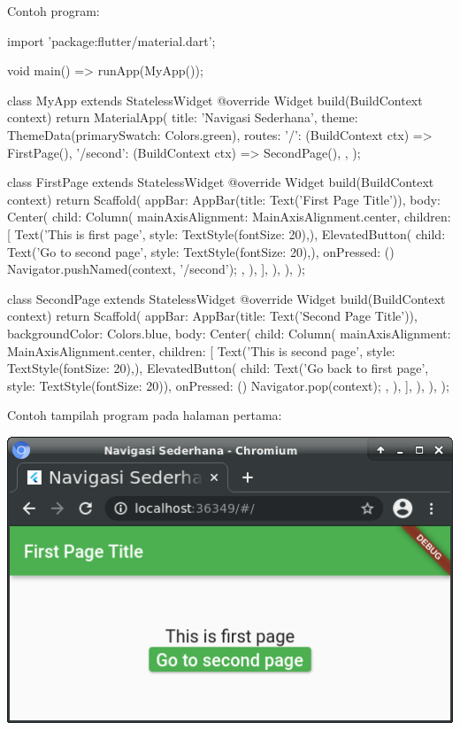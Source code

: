 \documentclass[a4paper,11pt]{article} %
\begin{document}
Contoh program:
\begin{dartcode}
import 'package:flutter/material.dart';

void main() => runApp(MyApp());

class MyApp extends StatelessWidget {
  @override
  Widget build(BuildContext context) {
    return MaterialApp(
      title: 'Navigasi Sederhana',
      theme: ThemeData(primarySwatch: Colors.green),
      routes: {
        '/': (BuildContext ctx) => FirstPage(),
        '/second': (BuildContext ctx) => SecondPage(),
      },
    );
  }  
}

class FirstPage extends StatelessWidget {
  @override
  Widget build(BuildContext context) {
    return Scaffold(
      appBar: AppBar(title: Text('First Page Title')),
      body: Center(
        child: Column(
          mainAxisAlignment: MainAxisAlignment.center,
          children: [
            Text('This is first page', style: TextStyle(fontSize: 20),),
            ElevatedButton(
              child: Text('Go to second page', style: TextStyle(fontSize: 20),),
              onPressed: () {
                Navigator.pushNamed(context, '/second');
              },
            ),
          ],
        ),
      ),
    );
  }
}
  
class SecondPage extends StatelessWidget {
  @override
  Widget build(BuildContext context) {
    return Scaffold(
      appBar: AppBar(title: Text('Second Page Title')),
      backgroundColor: Colors.blue,
      body: Center(
        child: Column(
          mainAxisAlignment: MainAxisAlignment.center,
          children: [
            Text('This is second page', style: TextStyle(fontSize: 20),),
            ElevatedButton(
              child: Text('Go back to first page', style: TextStyle(fontSize: 20)),
              onPressed: () {
                Navigator.pop(context);
              },
            ),
          ],
        ),
      ),
    );
  }
}
\end{dartcode}

Contoh tampilah program pada halaman pertama:

{\center
\includegraphics[scale=0.5]{images/navigation_named_01.png}
\par}
\end{document}
